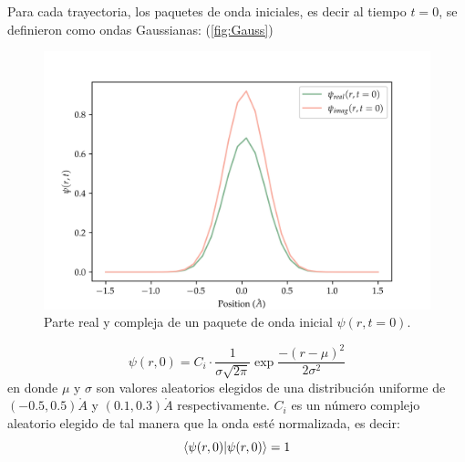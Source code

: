 Para cada trayectoria, los paquetes de onda iniciales, es decir al tiempo $t=0$, se definieron como ondas Gaussianas: (\autoref{fig:Gauss})
\begin{figure}[H]
  \centering
  \includegraphics[width=1\textwidth]{./img/DataWave.png}
  \caption{Parte real y compleja de un paquete de onda inicial $\psi(r,t=0)$.}
  \label{fig:Gauss}
\end{figure}

\begin{equation}
  \label{eq:gaussian}
  \psi(r,0) = C_i\cdot \frac{1}{\sigma\sqrt{2\pi}}\exp{\frac{-(r-\mu)^2}{2\sigma^2}}
\end{equation}
en donde $\mu$ y $\sigma$ son valores aleatorios elegidos de una distribución uniforme de $(-0.5,0.5)\mathring{A}$ y $(0.1,0.3)\mathring{A}$ respectivamente. $C_i$ es un número complejo aleatorio elegido de tal manera que la onda esté normalizada, es decir:
$$\bra{\psi(r,0)}\ket{\psi(r,0)} = 1$$

